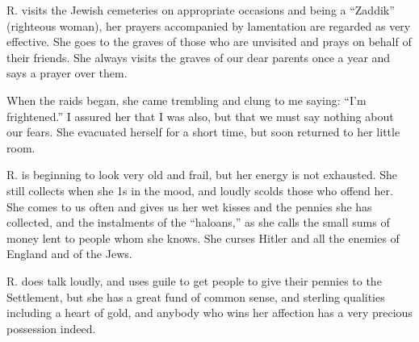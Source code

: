 R. visits the Jewish cemeteries on appropriate occasions
and being a “Zaddik” (righteous woman), her
prayers accompanied by lamentation are regarded as very
effective. She goes to the graves of those who are unvisited
and prays on behalf of their friends. She always
visits the graves of our dear parents once a year and says
a prayer over them.

When the raids began, she came trembling and clung
to me saying: “I’m frightened.” I assured her that I
was also, but that we must say nothing about our fears.
She evacuated herself for a short time, but soon returned
to her little room.

R. is beginning to look very old and frail, but her
energy is not exhausted. She still collects when she 1s in
the mood, and loudly scolds those who offend her. She
comes to us often and gives us her wet kisses and the
pennies she has collected, and the instalments of the “haloans,”
as she calls the small sums of money lent to
people whom she knows. She curses Hitler and all the
enemies of England and of the Jews.

R. does talk loudly, and uses guile to get people to give
their pennies to the Settlement, but she has a great fund
of common sense, and sterling qualities including a heart
of gold, and anybody who wins her affection has a very
precious possession indeed.

